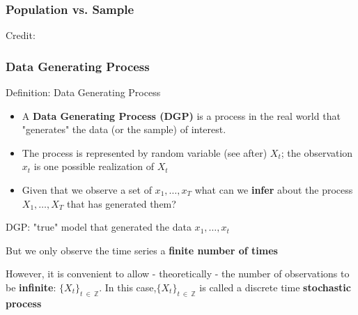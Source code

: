 \documentclass{beamer}
\newenvironment{wideenumerate}{\enumerate\addtolength{\itemsep}{10pt}}{\endenumerate}
\begin{document}
\begin{frame}
  \frametitle{Population vs. Sample}
  \hspace*{15pt}\hbox{\scriptsize Credit:}
\end{frame}

    
\begin{frame}
  \frametitle{Data Generating Process}
  
  \begin{block}{Definition: Data Generating Process}
    \begin{itemize}
    \item A \textbf{Data Generating Process (DGP)} is a process in the real world that "generates" the data (or the sample) of interest.
    \item The process is represented by random variable (see after) $X_t$; the observation $x_t$ is one possible realization of $X_t$
    \item Given that we observe a set of $x_1, \dots, x_T$ what can we \textbf{infer} about the process $X_1, \dots, X_T$ that has generated them?
    \end{itemize}        
  \end{block}

  \begin{wideenumerate}
    \item DGP: "true" model that generated the data $x_1, \dots, x_t$
    \item But we only observe the time series a \textbf{finite number of times}
    \item However, it is convenient to allow - theoretically - the number of observations to be \textbf{infinite}: $\{X_t\}_{t \ \in \ \mathbb{Z}}$. In this case,$\{X_t\}_{t \ \in \ \mathbb{Z}}$ is called a discrete time \textbf{stochastic process} 
  \end{wideenumerate}

  
\end{frame}
\end{document}
